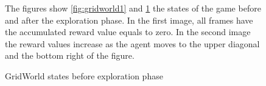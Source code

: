 \begin{figure}[h]
\begin{minipage}{.5\textwidth}
\caption{GridWorld states before exploration phase}
\label{fig:gridworld2}
\end{minipage}

The figures show  \ref{fig:gridworld1} and \ref{fig:gridworld2} the states of the game before and after the exploration phase. In the first image, all frames have the accumulated reward value equals to zero. In the second image the reward values increase as the agent moves to the upper diagonal and the bottom right of the figure.

\end{figure}





